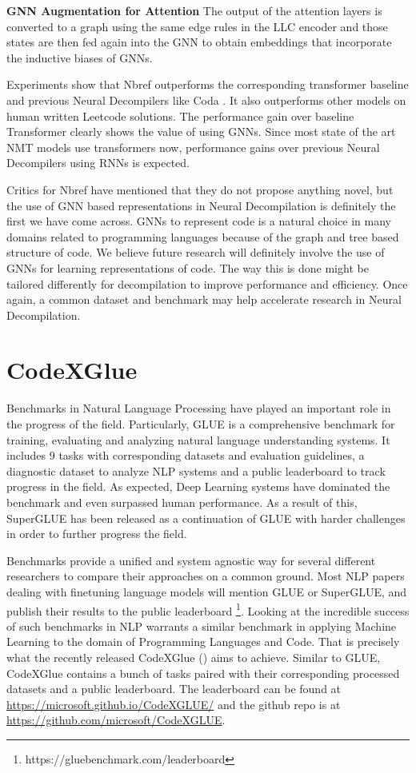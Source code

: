 \documentclass{article}
\begin{document}
\textbf{GNN Augmentation for Attention}
The output of the attention layers is converted to a graph using the same edge rules in the LLC encoder and those states are then fed again into the GNN to obtain embeddings that incorporate the inductive biases of GNNs.

Experiments show that Nbref outperforms the corresponding transformer baseline and previous Neural Decompilers like Coda \cite{coda}. It also outperforms other models on human written Leetcode solutions. The performance gain over baseline Transformer clearly shows the value of using GNNs. Since most state of the art NMT models use transformers now, performance gains over previous Neural Decompilers using RNNs is expected. 

Critics for Nbref have mentioned that they do not propose anything novel, but the use of GNN based representations in Neural Decompilation is definitely the first we have come across. GNNs to represent code is a natural choice in many domains related to programming languages because of the graph and tree based structure of code. We believe future research will definitely involve the use of GNNs for learning representations of code. The way this is done might be tailored differently for decompilation to improve performance and efficiency. Once again, a common dataset and benchmark may help accelerate research in Neural Decompilation. 

\section{CodeXGlue}
Benchmarks in Natural Language Processing have played an important role in the progress of the field. Particularly, GLUE \cite{wang2018glue} is a comprehensive benchmark for training, evaluating and analyzing natural language understanding systems. It includes 9 tasks with corresponding datasets and evaluation guidelines, a diagnostic dataset to analyze NLP systems and a public leaderboard to track progress in the field. As expected, Deep Learning systems have dominated the benchmark and even surpassed human performance. As a result of this, SuperGLUE \cite{wang2019superglue} has been released as a continuation of GLUE with harder challenges in order to further progress the field.

Benchmarks provide a unified and system agnostic way for several different researchers to compare their approaches on a common ground. Most NLP papers dealing with finetuning language models will mention GLUE or SuperGLUE, and publish their results to the public leaderboard \footnote{https://gluebenchmark.com/leaderboard}. Looking at the incredible success of such benchmarks in NLP warrants a similar benchmark in applying Machine Learning to the domain of Programming Languages and Code. That is precisely what the recently released CodeXGlue (\citet{lu2021codexglue}) aims to achieve. Similar to GLUE, CodeXGlue contains a bunch of tasks paired with their corresponding processed datasets and a public leaderboard. The leaderboard can be found at \url{https://microsoft.github.io/CodeXGLUE/} and the github repo is at \url{https://github.com/microsoft/CodeXGLUE}.
\end{document}

